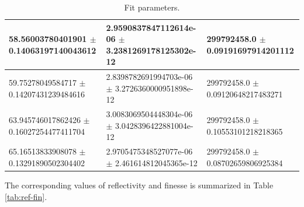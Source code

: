 \documentclass[a4paper]{report}
\numberwithin{equation}{section}
\begin{document}
\begin{table}[!ht]
\begin{tabular}{|l|l|l|}
        58.56003780401901 $\pm$ 0.14063197140043612 & 2.9590837847112614e-06 $\pm$ 3.2381269178125302e-12 & 299792458.0 $\pm$ 0.09191697914201112 \\ \hline
        59.75278049584717 $\pm$ 0.14207431239484616 & 2.8398782691994703e-06 $\pm$ 3.2726360000951898e-12 & 299792458.0 $\pm$ 0.09120648217483271 \\ \hline
        63.945746017862426 $\pm$ 0.16027254477411704 & 3.0083069504448304e-06 $\pm$ 3.0428396422881004e-12 & 299792458.0 $\pm$ 0.10553101218218365 \\ \hline
        65.16513833908078 $\pm$ 0.13291890502304402 & 2.9705475348527077e-06 $\pm$ 2.461614812045365e-12 & 299792458.0 $\pm$ 0.08702659806925384 \\ \hline
    \end{tabular}
    \caption{Fit parameters.}
    \label{tab:params}
\end{table}

The corresponding values of reflectivity and finesse is summarized in Table \ref{tab:ref-fin}.
\end{document}
